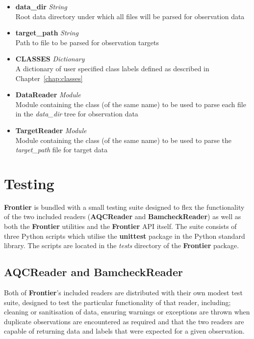 \begin{itemize}
    \item \textbf{data\_dir} \textit{String}\hfill\\
        Root data directory under which all files will be parsed for observation data
    \item \textbf{target\_path} \textit{String}\hfill\\
        Path to file to be parsed for observation targets
    \item \textbf{CLASSES} \textit{Dictionary}\hfill\\
        A dictionary of user specified class labels defined as described in
        Chapter~\ref{chap:classes}
    \item \textbf{DataReader} \textit{Module}\hfill\\
        Module containing the class (of the same name) to be used to parse each
        file in the \textit{data\_dir} tree for observation data
    \item \textbf{TargetReader} \textit{Module}\hfill\\
        Module containing the class (of the same name) to be used to parse the
        \textit{target\_path} file for target data
\end{itemize}


\section{Testing}

\textbf{Frontier} is bundled with a small testing suite designed to flex the
functionality of the two included readers (\textbf{AQCReader} and
\textbf{BamcheckReader}) as well as both the \textbf{Frontier} utilities and
the \textbf{Frontier} API itself. The suite consists of three Python scripts
which utilise the \textbf{unittest}\citep{py-unittest} package in the Python
standard library.  The scripts are located in the \textit{tests} directory of
the \textbf{Frontier} package.

\subsection{AQCReader and BamcheckReader}

Both of \textbf{Frontier}'s included readers are distributed with their own
modest test suite, designed to test the particular functionality of that reader,
including; cleaning or sanitisation of data, ensuring warnings or exceptions are
thrown when duplicate observations are encountered as required and that the two
readers are capable of returning data and labels that were expected for a given
observation.

